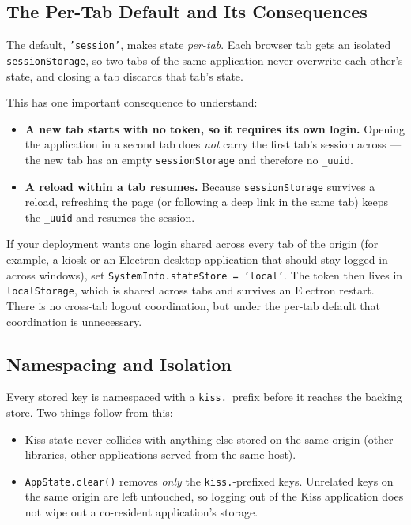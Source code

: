 \subsection{The Per-Tab Default and Its Consequences}
\label{sec:rs-appstate-pertab}

The default, \texttt{'session'}, makes state \emph{per-tab}.  Each browser tab gets an isolated \texttt{sessionStorage}, so two tabs of the same application never overwrite each other's state, and closing a tab discards that tab's state.

This has one important consequence to understand:

\begin{itemize}
  \item \textbf{A new tab starts with no token, so it requires its own login.}  Opening the application in a second tab does \emph{not} carry the first tab's session across --- the new tab has an empty \texttt{sessionStorage} and therefore no \texttt{\_uuid}.
  \item \textbf{A reload within a tab resumes.}  Because \texttt{sessionStorage} survives a reload, refreshing the page (or following a deep link in the same tab) keeps the \texttt{\_uuid} and resumes the session.
\end{itemize}

\begin{tipbox}
If your deployment wants one login shared across every tab of the origin (for example, a kiosk or an Electron desktop application that should stay logged in across windows), set \texttt{SystemInfo.stateStore = 'local'}.  The token then lives in \texttt{localStorage}, which is shared across tabs and survives an Electron restart.  There is no cross-tab logout coordination, but under the per-tab default that coordination is unnecessary.
\end{tipbox}

\subsection{Namespacing and Isolation}
\label{sec:rs-appstate-namespace}

Every stored key is namespaced with a \texttt{kiss.}\ prefix before it reaches the backing store.  Two things follow from this:

\begin{itemize}
  \item Kiss state never collides with anything else stored on the same origin (other libraries, other applications served from the same host).
  \item \texttt{AppState.clear()} removes \emph{only} the \texttt{kiss.}-prefixed keys.  Unrelated keys on the same origin are left untouched, so logging out of the Kiss application does not wipe out a co-resident application's storage.
\end{itemize}

